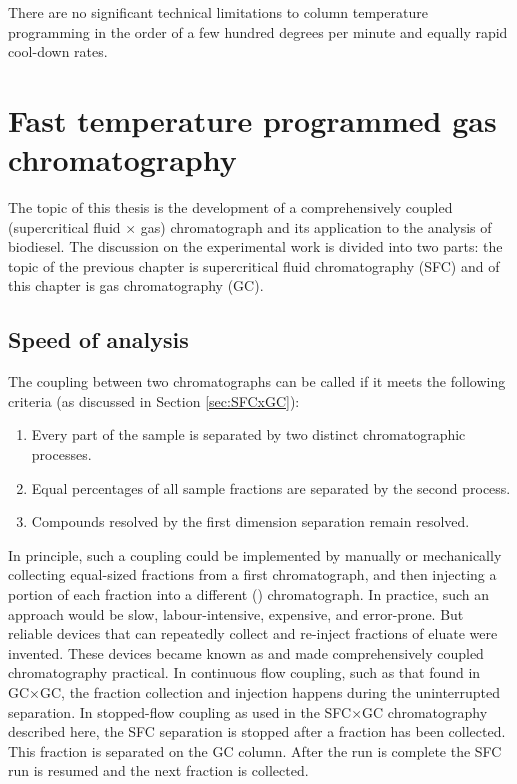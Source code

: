 
\begin{savequote}[\quotewidth] There are no significant technical limitations to column
temperature programming in the order of a few hundred degrees per minute and
equally rapid cool-down rates.
\end{savequote}

\chapter[Fast GC]{Fast temperature programmed gas chromatography} %

\label{Chapter5} %

The topic of this thesis is the development of a comprehensively coupled
(supercritical fluid × gas) chromatograph and its application to the analysis of
biodiesel. The discussion on the experimental work is divided into two
parts: the topic of the previous chapter is supercritical fluid chromatography
(SFC) and of this chapter is gas chromatography (GC).

\section{Speed of analysis}
\label{sec:SpeedOfAnalysis}

The coupling between two chromatographs can be called  if
it meets the following criteria (as discussed in Section \ref{sec:SFCxGC}):
\begin{enumerate}
  \item Every part of the sample is separated by two distinct chromatographic processes.
  \item Equal percentages of all sample fractions are separated by the second process.	 
  \item Compounds resolved by the first dimension separation remain resolved.  
\end{enumerate} 

In principle, such a coupling could be implemented by manually or mechanically
collecting equal-sized fractions from a first \oneD chromatograph, and then
injecting a portion of each fraction into a different (\twoD) chromatograph. In
practice, such an approach would be slow, labour-intensive, expensive, and
error-prone. But reliable devices that can repeatedly collect and re-inject
fractions of eluate were invented. These devices became known as
 and made comprehensively coupled chromatography practical.
In continuous flow coupling, such as that found in GC×GC, the fraction
collection and \twoD injection happens during the uninterrupted \oneD
separation. In stopped-flow coupling as used in the SFC×GC chromatography
described here, the \oneD SFC separation is stopped after a fraction has been
collected. This fraction is separated on the \twoD GC column. After the \twoD
run is complete the SFC run is resumed and the next fraction is collected.

